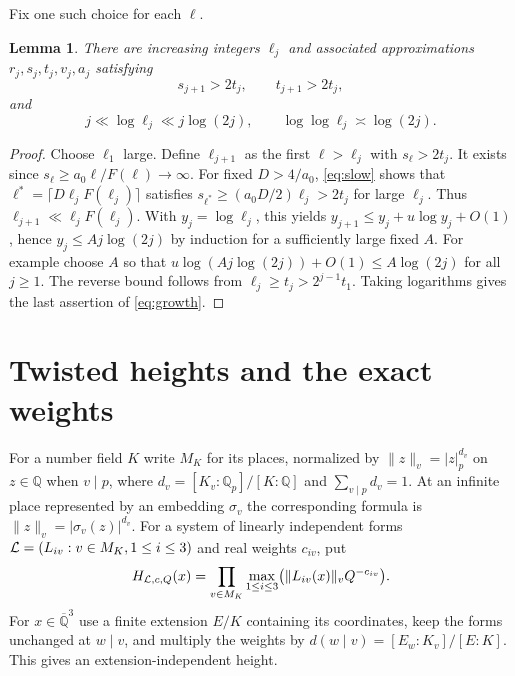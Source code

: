 \documentclass[11pt]{article}
\numberwithin{equation}{section}
\newtheorem{lemma}[theorem]{Lemma}
\theoremstyle{remark}\newtheorem{remark}[theorem]{Remark}
\newcommand{\Q}{\mathbb Q}\newcommand{\Z}{\mathbb Z}
\newcommand{\Qbar}{\overline{\mathbb Q}}
\begin{document}
Fix one such choice for each $\ell$.
\begin{lemma}\label{lem:selection}
There are increasing integers $\ell_j$ and associated approximations
$r_j,s_j,t_j,v_j,a_j$ satisfying
\begin{equation}\label{eq:select}
 s_{j+1}>2t_j,\qquad t_{j+1}>2t_j,
\end{equation}
and
\begin{equation}\label{eq:growth}
 j\ll\log\ell_j\ll j\log(2j),\qquad
 \log\log\ell_j\asymp\log(2j).
\end{equation}
\end{lemma}
\begin{proof}
Choose $\ell_1$ large. Define $\ell_{j+1}$ as the first $\ell>\ell_j$
with $s_\ell>2t_j$. It exists since
$s_\ell\ge a_0\ell/F(\ell)\to\infty$.
For fixed $D>4/a_0$, \eqref{eq:slow} shows that
$\ell^*=\lceil D\ell_jF(\ell_j)\rceil$ satisfies
$s_{\ell^*}\ge(a_0D/2)\ell_j>2t_j$ for large $\ell_j$.
Thus $\ell_{j+1}\ll\ell_jF(\ell_j)$.
With $y_j=\log\ell_j$, this yields
$y_{j+1}\le y_j+u\log y_j+O(1)$, hence
$y_j\le A j\log(2j)$ by induction for a sufficiently large fixed $A$.
For example choose $A$ so that
$u\log(Aj\log(2j))+O(1)\le A\log(2j)$ for all $j\ge1$.
The reverse bound follows from $\ell_j\ge t_j>2^{j-1}t_1$.
Taking logarithms gives the last assertion of \eqref{eq:growth}.
\end{proof}

\section{Twisted heights and the exact weights}\label{sec:height}
For a number field $K$ write $M_K$ for its places, normalized by
$\|z\|_v=|z|_p^{d_v}$ on $z\in\Q$ when $v\mid p$, where
$d_v=[K_v:\Q_p]/[K:\Q]$ and $\sum_{v\mid p}d_v=1$.
At an infinite place represented by an embedding $\sigma_v$ the
corresponding formula is $\|z\|_v=|\sigma_v(z)|^{d_v}$.
For a system of linearly independent forms
$\mathcal L=(L_{iv}:v\in M_K,1\le i\le3)$ and real weights $c_{iv}$, put
\begin{equation}\label{eq:height}
 H_{\mathcal L,c,Q}(x)=\prod_{v\in M_K}
 \max_{1\le i\le3}\bigl(\|L_{iv}(x)\|_vQ^{-c_{iv}}\bigr).
\end{equation}
For $x\in\Qbar^3$ use a finite extension $E/K$ containing its coordinates,
keep the forms unchanged at $w\mid v$, and multiply the weights by
$d(w\mid v)=[E_w:K_v]/[E:K]$. This gives an extension-independent height.
\end{document}
